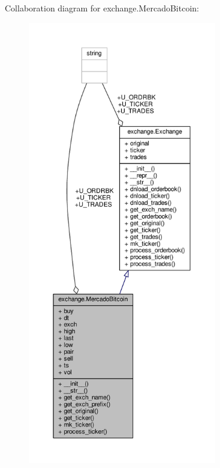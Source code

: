 Collaboration diagram for exchange.\+Mercado\+Bitcoin\+:
\nopagebreak
\begin{figure}[H]
\begin{center}
\leavevmode
\includegraphics[height=550pt]{classexchange_1_1_mercado_bitcoin__coll__graph}
\end{center}
\end{figure}
